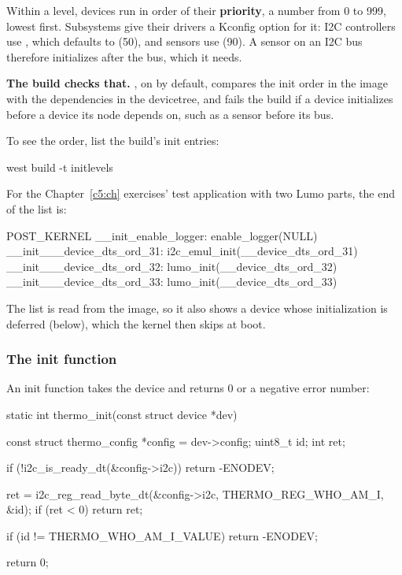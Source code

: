 Within a level, devices run in order of their \textbf{priority}, a number from 0 to 999, lowest
first. Subsystems give their drivers a Kconfig option for it: I2C controllers use
, which defaults to  (50),
and sensors use  (90). A sensor on an I2C bus therefore
initializes after the bus, which it needs.

\textbf{The build checks that.} , on by default, compares the
init order in the image with the dependencies in the devicetree, and fails the build if a device
initializes before a device its node depends on, such as a sensor before its bus.

To see the order, list the build’s init entries:

\begin{shell}
west build -t initlevels
\end{shell}

\noindent For the Chapter~\ref{c5:ch} exercises’ test application with two Lumo parts, the end of
the list is:

\begin{console}
POST_KERNEL
  __init_enable_logger: enable_logger(NULL)
  __init___device_dts_ord_31: i2c_emul_init(__device_dts_ord_31)
  __init___device_dts_ord_32: lumo_init(__device_dts_ord_32)
  __init___device_dts_ord_33: lumo_init(__device_dts_ord_33)
\end{console}

\noindent The list is read from the image, so it also shows a device whose initialization is
deferred (below), which the kernel then skips at boot.

\subsubsection{The init function}
An init function takes the device and returns 0 or a negative error number:

\begin{ccode}
static int thermo_init(const struct device *dev)
{
	const struct thermo_config *config = dev->config;
	uint8_t id;
	int ret;

	if (!i2c_is_ready_dt(&config->i2c)) {
		return -ENODEV;
	}

	ret = i2c_reg_read_byte_dt(&config->i2c, THERMO_REG_WHO_AM_I, &id);
	if (ret < 0) {
		return ret;
	}

	if (id != THERMO_WHO_AM_I_VALUE) {
		return -ENODEV;
	}

	return 0;
}
\end{ccode}

